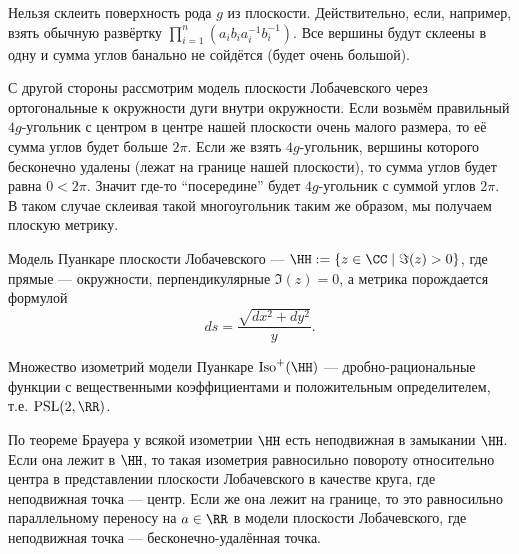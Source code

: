 \documentclass[12pt,a4paper]{article}
\DeclareMathOperator{\Iso}{Iso}
\DeclareMathOperator{\PSL}{PSL}
\begin{document}
    \begin{remark}
        Нельзя склеить поверхность рода $g$ из плоскости. Действительно, если, например, взять обычную развёртку $\prod_{i=1}^n (a_i b_i a_i^{-1} b_i^{-1})$. Все вершины будут склеены в одну и сумма углов банально не сойдётся (будет очень большой).

        С другой стороны рассмотрим модель плоскости Лобачевского через ортогональные к окружности дуги внутри окружности. Если возьмём правильный $4g$-угольник с центром в центре нашей плоскости очень малого размера, то её сумма углов будет больше $2\pi$. Если же взять $4g$-угольник, вершины которого бесконечно удалены (лежат на границе нашей плоскости), то сумма углов будет равна $0 < 2\pi$. Значит где-то ``посередине'' будет $4g$-угольник с суммой углов $2\pi$. В таком случае склеивая такой многоугольник таким же образом, мы получаем плоскую метрику.
    \end{remark}

    \begin{definition}
        Модель Пуанкаре плоскости Лобачевского --- $\HH := \{z \in \CC \mid \Im(z) > 0\}$, где прямые --- окружности, перпендикулярные $\Im(z) = 0$, а метрика порождается формулой
        \[ds = \frac{\sqrt{dx^2 + dy^2}}{y}.\]

        Множество изометрий модели Пуанкаре $\Iso^+(\HH)$ --- дробно-рациональные функции с вещественными коэффициентами и положительным определителем, т.е. $\PSL(2, \RR)$.
    \end{definition}

    \begin{remark}
        По теореме Брауера у всякой изометрии $\HH$ есть неподвижная в замыкании $\HH$. Если она лежит в $\HH$, то такая изометрия равносильно повороту относительно центра в представлении плоскости Лобачевского в качестве круга, где неподвижная точка --- центр. Если же она лежит на границе, то это равносильно параллельному переносу на $a \in \RR$ в модели плоскости Лобачевского, где неподвижная точка --- бесконечно-удалённая точка. 
    \end{remark}

    \begin{definition}
        
    \end{definition}
\end{document}
